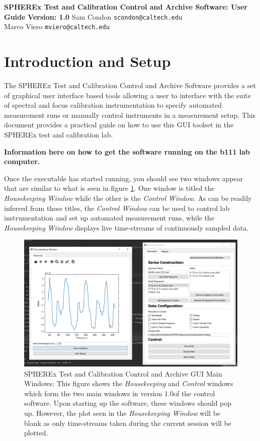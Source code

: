\documentclass{article}
\newcommand{\version}{1.0}
\begin{document}
	\begin{center}
		{\Large\bf SPHEREx Test and Calibration Control and Archive Software: User Guide}
		\vskip 0.25in
		{\large\bf Version: \version}
		\vskip 0.25in
		Sam Condon \texttt{scondon@caltech.edu} \\
		Marco Viero \texttt{mviero@caltech.edu} 
		\vskip 0.125in
	\end{center}
	
\section{Introduction and Setup}

The SPHEREx Test and Calibration Control and Archive Software provides a set of graphical user interface based tools allowing a user to interface with the suite of spectral and focus calibration instrumentation to specify automated measurement runs or manually control instruments in a measurement setup. This document provides a practical guide on how to use this GUI toolset in the SPHEREx test and calibration lab.

\textbf{Information here on how to get the software running on the b111 lab computer.}

Once the executable has started running, you should see two windows appear that are similar to what is seen in figure \ref{Main GUI}. One window is titled the \emph{Housekeeping Window} while the other is the \emph{Control Window}. As can be readily inferred from these titles, the \emph{Control Window} can be used to control lab instrumentation and set up automated measurement runs, while the \emph{Housekeeping Window} displays live time-streams of continuously sampled data.

\begin{figure}[H]
\label{Main GUI}
\includegraphics[width=\textwidth]{./images/MainGUIViews.png}
\caption{SPHEREx Test and Calibration Control and Archive GUI Main Windows: This figure shows the \emph{Housekeeping} and \emph{Control} windows which form the two main windows in version \version of the control software. Upon starting up the software, these windows should pop up. However, the plot seen in the \emph{Housekeeping Window} will be blank as only time-streams taken during the current session will be plotted.}	
\end{figure}
\end{document}
